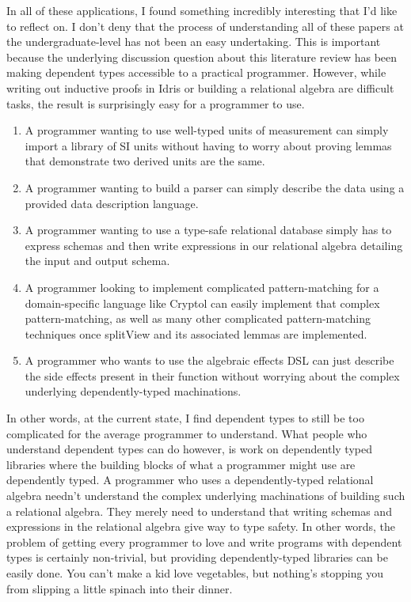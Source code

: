 In all of these applications, I found something incredibly interesting that I'd
like to reflect on. I don't deny that the process of understanding all of these
papers at the undergraduate-level has not been an easy undertaking. This is
important because the underlying discussion question about this literature
review has been making dependent types accessible to a practical programmer.
However, while writing out inductive proofs in Idris or building a relational
algebra are difficult tasks, the result is surprisingly easy for a programmer to
use. 
\begin{enumerate}
    \item A programmer wanting to use well-typed units of measurement can simply
    import a library of SI units without having to worry about proving lemmas
    that demonstrate two derived units are the same. 
    \item A programmer wanting to build a parser can simply describe the data
    using a provided data description language. 
    \item A programmer wanting to use a type-safe relational database simply has
    to express schemas and then write expressions in our relational algebra
    detailing the input and output schema. 
    \item A programmer looking to implement complicated pattern-matching for a
    domain-specific language like Cryptol can easily implement that complex
    pattern-matching, as well as many other complicated pattern-matching
    techniques once splitView and its associated lemmas are implemented. 
    \item A programmer who wants to use the algebraic effects DSL can just
    describe the side effects present in their function without worrying about
    the complex underlying dependently-typed machinations. 
\end{enumerate}

In other words, at the current state, I find dependent types to still be too
complicated for the average programmer to understand. What people who understand
dependent types can do however, is work on dependently typed libraries where the
building blocks of what a programmer might use are dependently typed. A
programmer who uses a dependently-typed relational algebra needn't understand
the complex underlying machinations of building such a relational algebra. They
merely need to understand that writing schemas and expressions in the relational
algebra give way to type safety. In other words, the problem of getting every
programmer to love and write programs with dependent types is certainly
non-trivial, but providing dependently-typed libraries can be easily done. You
can't make a kid love vegetables, but nothing's stopping you from slipping a
little spinach into their dinner. 


